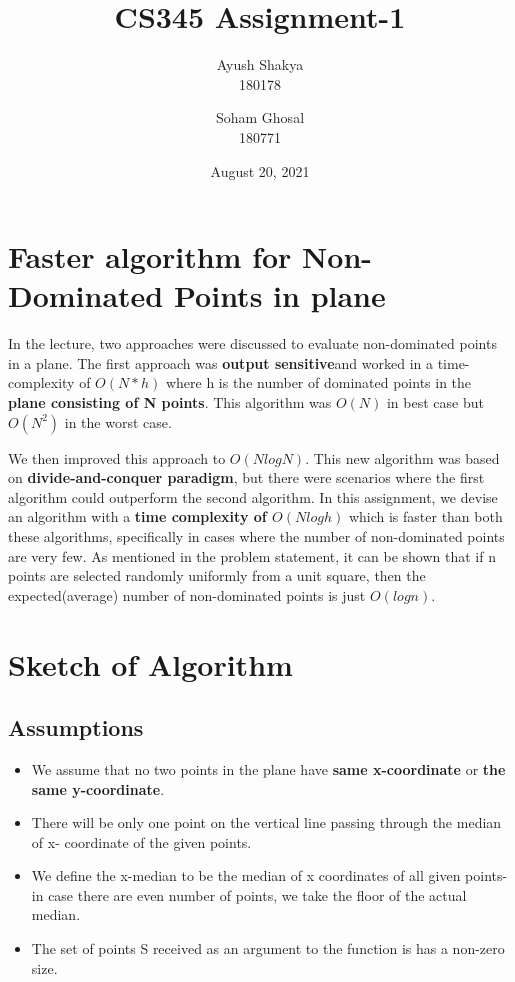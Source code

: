 \documentclass{article}
\title{CS345 Assignment-1}
\author{Ayush Shakya \\180178 \and Soham Ghosal \\180771}
\date{August 20, 2021}
\begin{document}
\maketitle

\vspace{0.75cm}
\section{Faster algorithm for Non-Dominated Points in plane}
In the lecture, two approaches were discussed to evaluate non-dominated points in a plane. The first approach was \textbf{output sensitive}and worked in a time-complexity of $O(N*h)$ where h is the number of dominated points in the \textbf{plane consisting of N points}. This algorithm was $O(N)$ in best case but $O(N^2)$ in the worst case.
\par
We then improved this approach to $O(NlogN)$. This new algorithm was based on \textbf{divide-and-conquer paradigm}, but there were scenarios where the first algorithm could outperform the second algorithm. In this assignment, we devise an algorithm with a \textbf{time complexity of $O(Nlogh)$} which is faster than both these algorithms, specifically in cases where the number of non-dominated points are very few. As mentioned in the problem statement, it can be shown that if n points are selected randomly uniformly from a unit square, then the expected(average) number of non-dominated points is just $O(log n)$.
\vspace{1cm}
\section{Sketch of Algorithm}

\subsection{Assumptions}
\begin{itemize}
    \item We assume that no two points in the plane have \textbf{same x-coordinate} or \textbf{the same y-coordinate}.
    \item There will be only one point on the vertical line passing through the median of x- coordinate of the given points.
    \item We define the x-median to be the median of x coordinates of all given points-in case there are even number of points, we take the floor of the actual median.
    \item The set of points S received as an argument to the function is has a non-zero size.
\end{itemize}
\end{document}
